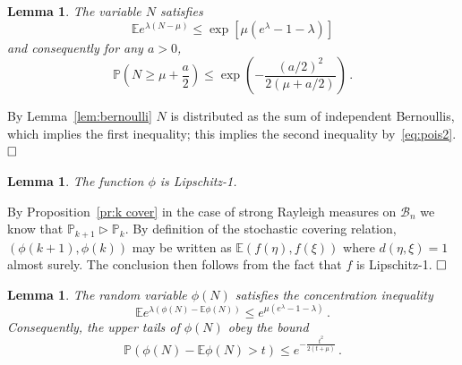 \documentclass[10pt]{article}
\theoremstyle{plain}
\newtheorem{lem}[thm]{Lemma}
\theoremstyle{remark}
\def\Cox{\qed}
\def\E{{\mathbb E}}
\def\P{{\mathbb P}}
\def\Cox{\hfill \Box}
\def\B{{\mathcal B}}
\def\mcovers{\triangleright}
\def\mean{\mu}
\begin{document}
\begin{lem} \label{lem:N concentration}
The variable $N$ satisfies
$$\E e^{\lambda (N - \mean)} \leq \exp \left [ \mean (e^\lambda - 1 - \lambda)
   \right ]$$
and consequently for any $a > 0$,
$$\P \left ( N \geq \mean + \frac{a}{2} \right ) \leq
   \exp \left ( - \frac{(a/2)^2}{2 (\mean + a/2)} \right ) \, .$$
\end{lem}

 By Lemma~\ref{lem:bernoulli} $N$ is
distributed as the sum of independent Bernoullis, which
implies the first inequality; this implies the second inequality
by~\eqref{eq:pois2}.
$\Cox$

\begin{lem} \label{lem:phi lipschitz}
The function $\phi$ is Lipschitz-1.
\end{lem}

 By Proposition~\ref{pr:k cover} in the case
of strong Rayleigh measures on $\B_n$
 we know that
$\P_{k+1} \mcovers \P_k$.  By definition of
the stochastic covering relation, $(\phi (k+1) , \phi (k))$
may be written as $\E (f(\eta) , f(\xi))$ where $d(\eta , \xi) = 1$
almost surely.  The conclusion then follows from the fact that
$f$ is Lipschitz-1.
$\Cox$

\begin{lem} \label{lem:phi concentration}
The random variable $\phi (N)$ satisfies the concentration inequality
$$\E e^{\lambda (\phi (N) - \E \phi (N))} \leq
   e^{\mean (e^\lambda - 1 - \lambda)} \, .$$
Consequently, the upper tails of $\phi (N)$ obey the bound
$$\P (\phi (N) - \E \phi (N) > t) \leq
   e^{-\frac{t^2}{2 (t + \mean)}} \, .$$
\end{lem}
\end{document}
